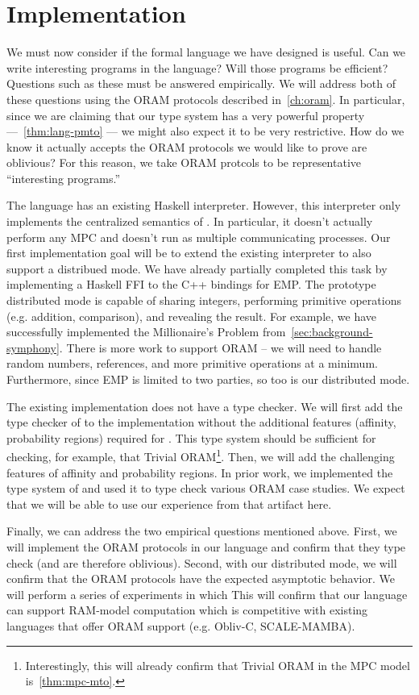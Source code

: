 \section{Implementation}

We must now consider if the formal language we have designed is useful. Can we write interesting programs in the language?
Will those programs be efficient? Questions such as these must be answered empirically. We will address both of these questions
using the ORAM protocols described in~\cref{ch:oram}. In particular, since we are claiming that our type system has a very powerful
property ---~\cref{thm:lang-pmto} --- we might also expect it to be very restrictive. How do we know it actually accepts the ORAM
protocols we would like to prove are oblivious? For this reason, we take ORAM protcols to be representative ``interesting programs.''

The \mpc language has an existing Haskell interpreter. However, this interpreter only implements the centralized semantics of \mpc.
In particular, it doesn't actually perform any MPC and doesn't run as multiple communicating processes. Our first implementation
goal will be to extend the existing interpreter to also support a distribued mode. We have already partially completed this task
by implementing a Haskell FFI to the C++ bindings for EMP. The prototype distributed mode is capable of sharing integers, performing
primitive operations (e.g. addition, comparison), and revealing the result. For example, we have successfully implemented the Millionaire's Problem
from~\ref{sec:background-symphony}. There is more work to support ORAM -- we will need to handle random numbers, references, and
more primitive operations at a minimum. Furthermore, since EMP is limited to two parties, so too is our distributed mode.

The existing \mpc implementation does not have a type checker. We will first add the type checker of \mpc to the implementation without
the additional features (affinity, probability regions) required for \lang. This type system should be sufficient for checking, for example,
that Trivial ORAM\footnote{Interestingly, this will already confirm that Trivial ORAM in the MPC model is~\ref{thm:mpc-mto}.}. Then, we will
add the challenging features of affinity and probability regions. In prior work, we implemented the type system of \obliv and used it to
type check various ORAM case studies. We expect that we will be able to use our experience from that artifact here.

Finally, we can address the two empirical questions mentioned above. First, we will implement the ORAM protocols in our language and confirm
that they type check (and are therefore oblivious). Second, with our distributed mode, we will confirm that the ORAM protocols have the
expected asymptotic behavior. We will perform a series of experiments in which 
This will confirm that our language can support RAM-model computation which is competitive with existing languages that offer ORAM support
(e.g. Obliv-C, SCALE-MAMBA).


